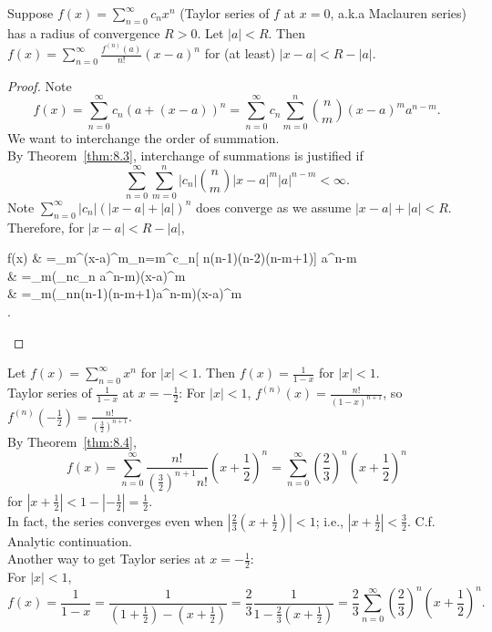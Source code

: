 \begin{thm}[4]
	Suppose $f(x)=\sum_{n=0}^{\infty}{c_n x^{n}}$ (Taylor series of $f$ at $x=0$, a.k.a Maclauren series) has a radius of convergence $R>0$.
	Let $\left|a\right|<R$.
	Then $f(x)=\sum_{n=0}^{\infty}{\frac{f^{(n)}(a)}{n!}(x-a)^{n}}$ for (at least) $\left|x-a\right|<R-\left|a\right|$.
	\begin{proof}
		Note \[
			f(x)=\sum_{n=0}^{\infty}{c_n \left( a+(x-a) \right)^{n}}=\sum_{n=0}^{\infty}{c_n}\sum_{m=0}^{n}{\binom{n}{m}(x-a)^{m}a^{n-m}}
			.\]
		We want to interchange the order of summation.\\
		By Theorem~\ref{thm:8.3}, interchange of summations is justified if \[
			\sum_{n=0}^{\infty}{\sum_{m=0}^{n}{\left|c_n\right|\binom{n}{m}\left|x-a\right|^{m}\left|a\right|^{n-m}}}<\infty
			.\]
		Note $\sum_{n=0}^{\infty}{\left|c_{n}\right|\left( \left|x-a\right|+\left|a\right|\right)^{n}}$ does converge as we assume $\left|x-a\right|+\left|a\right|<R$.\\
		Therefore, for $\left|x-a\right| < R-\left|a\right|$,
		\begin{flalign*}
			f(x) & =\sum_{m}^{\infty}(x-a)^{m}{\sum_{n=m}^{\infty}{c_n[ n\cdot (n-1)(n-2)\cdots \cdot (n-m+1)] a^{n-m}}} \\
			     & =\sum_{m}{\left(\sum_{n}{c_n a^{n-m}}\right)(x-a)^{m}}                                                \\
			     & =\sum_{m}{\left(\sum_{n}{n(n-1)\cdots (n-m+1)a^{n-m}}\right)(x-a)^{m}}                       \\
			.\end{flalign*}
	\end{proof}
	\begin{example}
		Let $f(x)=\sum_{n=0}^{\infty}{x^{n}}$ for $\left|x\right|<1 $. Then $f(x)=\frac{1}{1-x}$ for $\left|x\right|<1$.\\
		Taylor series of $\frac{1}{1-x}$ at $x=-\frac{1}{2}$:
		For $\left|x\right| < 1$, $f^{(n)}(x)=\frac{n!}{(1-x)^{n+1}}$, so $f^{(n)}(-\frac{1}{2})=\frac{n!}{(\frac{3}{2})^{n+1}}$.\\
		By Theorem~\ref{thm:8.4},
		\[
			f(x)=\sum_{n=0}^{\infty}{\frac{n!}{(\frac{3}{2})^{n+1}n!}\left(x+\frac{1}{2}\right)^{n}}=\sum_{n=0}^{\infty}{(\frac{2}{3})^{n}\left(x+\frac{1}{2}\right)^{n}}
		\]
		for $\left|x+\frac{1}{2}\right|<1-\left|-\frac{1}{2}\right| =\frac{1}{2}$.\\
		In fact, the series converges even when $\left|\frac{2}{3}\left(x+\frac{1}{2}\right)\right|<1$; i.e., $\left|x+\frac{1}{2}\right| <\frac{3}{2}$. C.f. Analytic continuation.\\
		Another way to get Taylor series at $x=-\frac{1}{2}$:\\
		For $\left|x\right|<1 $,
		\[
			f(x)=\frac{1}{1-x}=\frac{1}{\left(1+\frac{1}{2}\right)-\left(x+\frac{1}{2}\right)}=\frac{2}{3} \frac{1}{1-\frac{2}{3}\left(x+\frac{1}{2}\right)}=\frac{2}{3}\sum_{n=0}^{\infty}{\left(\frac{2}{3}\right)^{n}\left(x+\frac{1}{2}\right)^n}.
		\]
	\end{example}
\end{thm}

